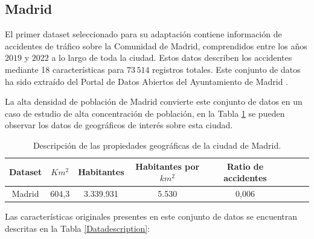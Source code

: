 \documentclass{uathesis-es}
\begin{document}
{\subsection*{Madrid}

El primer dataset seleccionado para su adaptación contiene información de accidentes de tráfico sobre la Comunidad de Madrid, comprendidos entre los años $2019$ y $2022$ a lo largo de toda la ciudad. Estos datos describen los accidentes mediante 18 características para $73\,514$ registros totales. Este conjunto de datos ha sido extraído del Portal de Datos Abiertos del Ayuntamiento de Madrid \cite{InfoDatasetMadrid}. 

La alta densidad de población de Madrid convierte este conjunto de datos en un caso de estudio de alta concentración de población, en la Tabla \ref{Madrid_statistics} se pueden observar los datos de geográficos de interés sobre esta ciudad.

\begin{table}[ht]
    \begin{center}
        \begin{tabular}{|c|c||c|c|c|c|c|c|}
        \hline
        \textbf{Dataset} & \textbf{$Km^2$} & \textbf{Habitantes} & \textbf{Habitantes por $km^2$} & \textbf{Ratio de accidentes}
        \\ \hline \hline

        Madrid & 604,3 & 3.339.931 & 5.530 & 0,006 \\ \hline

        \end{tabular}
    \end{center}
    \caption{Descripción de las propiedades geográficas de la ciudad de Madrid.}
    \label{Madrid_statistics}
\end{table}

Las características originales presentes en este conjunto de datos se encuentran descritas en la Tabla \ref{Datadescription}:

}
\end{document}
